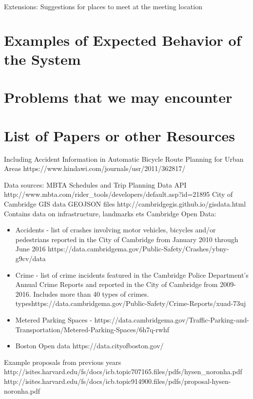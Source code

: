 \documentclass[11pt]{article}
\begin{document}
Extensions:
Suggestions for places to meet at the meeting location 


\section{Examples of Expected Behavior of the System}

\section{Problems that we may encounter}

\section{List of Papers or other Resources}
Including Accident Information in Automatic Bicycle Route Planning for Urban Areas https://www.hindawi.com/journals/usr/2011/362817/


Data sources:
MBTA Schedules and Trip Planning Data API http://www.mbta.com/rider\_tools/developers/default.asp?id=21895
City of Cambridge GIS data GEOJSON files http://cambridgegis.github.io/gisdata.html
Contains data on infrastructure, landmarks ets
Cambridge Open Data:
\begin{itemize}
\item Accidents - list of crashes involving motor vehicles, bicycles and/or pedestrians reported in the City of Cambridge from January 2010 through June 2016 https://data.cambridgema.gov/Public-Safety/Crashes/ybny-g9cv/data
\item Crime - list of crime incidents featured in the Cambridge Police Department’s Annual Crime Reports and reported in the City of Cambridge from 2009-2016. Includes more than 40 types of crimes. typeshttps://data.cambridgema.gov/Public-Safety/Crime-Reports/xuad-73uj
\item Metered Parking Spaces - https://data.cambridgema.gov/Traffic-Parking-and-Transportation/Metered-Parking-Spaces/6h7q-rwhf
\item Boston Open data https://data.cityofboston.gov/
\end{itemize}

Example proposals from previous years
http://isites.harvard.edu/fs/docs/icb.topic707165.files/pdfs/hysen\_noronha.pdf
http://isites.harvard.edu/fs/docs/icb.topic914900.files/pdfs/proposal-hysen-noronha.pdf
\end{document}
